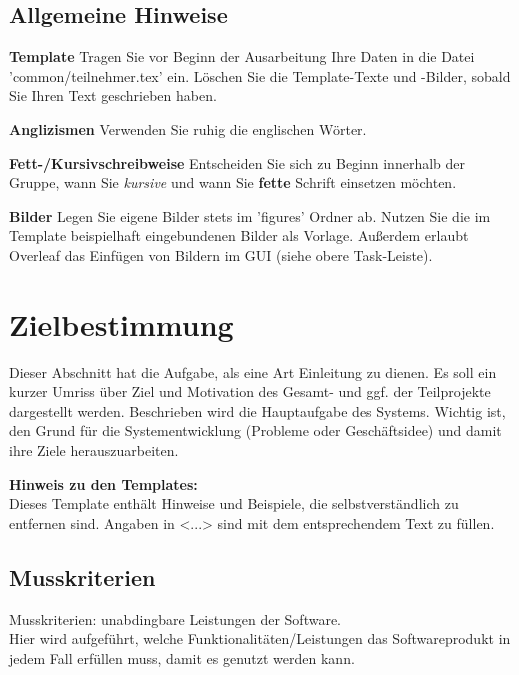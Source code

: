 \section{Allgemeine Hinweise}
\textbf{Template} Tragen Sie vor Beginn der Ausarbeitung Ihre Daten in die Datei 'common/teilnehmer.tex' ein. Löschen Sie die Template-Texte und -Bilder, sobald Sie Ihren Text geschrieben haben.

\textbf{Anglizismen} Verwenden Sie ruhig die englischen Wörter.

\textbf{Fett-/Kursivschreibweise} Entscheiden Sie sich zu Beginn innerhalb der Gruppe, wann Sie \textit{kursive} und wann Sie \textbf{fette} Schrift einsetzen möchten.

\textbf{Bilder} Legen Sie eigene Bilder stets im 'figures' Ordner ab. Nutzen Sie die im Template beispielhaft eingebundenen Bilder als Vorlage. Außerdem erlaubt Overleaf das Einfügen von Bildern im GUI (siehe obere Task-Leiste).


\chapter{Zielbestimmung}
\label{chap:target}
Dieser Abschnitt hat die Aufgabe, als eine Art Einleitung zu dienen. Es soll
ein kurzer Umriss über Ziel und Motivation des Gesamt- und ggf. der
Teilprojekte dargestellt werden. Beschrieben wird die Hauptaufgabe des Systems.
Wichtig ist, den Grund für die Systementwicklung (Probleme oder Geschäftsidee)
und damit ihre Ziele herauszuarbeiten.

\textbf{Hinweis zu den Templates:}\\
Dieses Template enthält Hinweise und Beispiele, die selbstverständlich zu entfernen sind. 
Angaben in <...> sind mit dem entsprechendem Text zu füllen.
\section{Musskriterien}\label{sec:musskriterien}
Musskriterien: unabdingbare Leistungen der Software. \\
Hier wird aufgeführt, welche Funktionalitäten/Leistungen das Softwareprodukt in
jedem Fall erfüllen muss, damit es genutzt werden kann.



